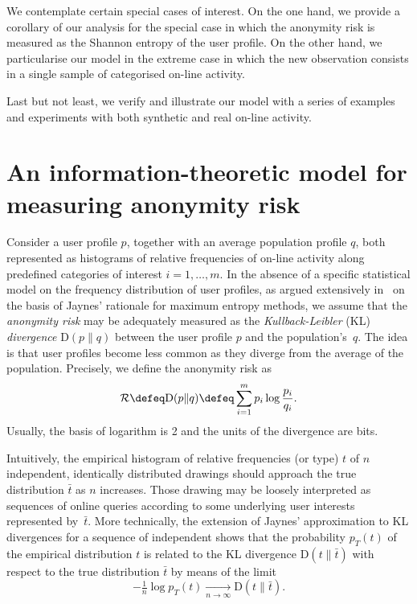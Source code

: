 We contemplate certain special cases of interest. On the one hand, we provide a corollary of our analysis for the special case in which the anonymity risk is measured as the Shannon entropy of the user profile. On the other hand, we particularise our model in the extreme case in which the new observation consists in a single sample of categorised on-line activity.

Last but not least, we verify and illustrate our model with a series of examples and experiments with both synthetic and real on-line activity.

\section{An information\hyp theoretic model for measuring anonymity risk}
\label{sec:1.1}
Consider a user profile $p$, together with an average population profile $q$, both represented as histograms of relative frequencies of on-line activity along predefined categories of interest $i=1,\dots,m$. In the absence of a specific statistical model on the frequency distribution of user profiles, as argued extensively in~\cite{Rebollo10IT, Rebollo11SecTech, Parra14FGCS} on the basis of Jaynes' rationale for maximum entropy methods, we assume that the \emph{anonymity risk} may be adequately measured as the \emph{Kullback\hyp Leibler} (KL) \emph{divergence} $\text{D}(p\|q)$ between the user profile $p$ and the population's~$q$. The idea is that user profiles become less common as they diverge from the average of the population. Precisely, we define the anonymity risk as
$$\mathcal{R}\defeq\text{D}(p\|q)\defeq\sum_{i=1}^m p_i\log \frac{p_i}{q_i}.$$
Usually, the basis of logarithm is 2 and the units of the divergence are bits.

Intuitively, the empirical histogram of relative frequencies (or type) $t$ of $n$ independent, identically distributed drawings should approach the true distribution $\bar{t}$ as $n$ increases. Those drawing may be loosely interpreted as sequences of online queries according to some underlying user interests represented by~$\bar{t}$. More technically, the extension of Jaynes' approximation to KL divergences for a sequence of independent shows that the probability $p_T(t)$ of the empirical distribution $t$ is related to the KL divergence $\text{D}(t\|\bar{t})$ with respect to the true distribution $\bar{t}$ by means of the limit
$$-\tfrac{1}{n}\log p_T(t)\xrightarrow[n\to\infty]{}\text{D}(t\|\bar{t}).$$

